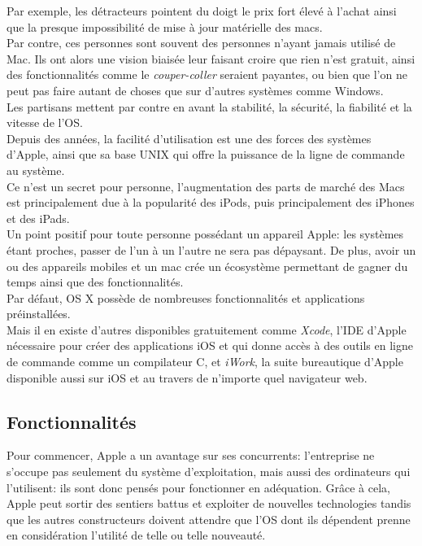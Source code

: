 Par exemple, les détracteurs pointent du doigt le prix fort élevé à l’achat
ainsi que la presque impossibilité de mise à jour matérielle des macs. \\
Par contre, ces personnes sont souvent des personnes n’ayant jamais utilisé de
Mac. Ils ont alors une vision biaisée leur faisant croire que rien n’est gratuit,
ainsi des fonctionnalités comme le \textit{couper-coller} seraient payantes, ou
bien que l’on ne peut pas faire autant de choses que sur d’autres systèmes comme
Windows. \\

Les partisans mettent par contre en avant la stabilité, la sécurité, la fiabilité
et la vitesse de l’OS. \\
Depuis des années, la facilité d’utilisation est une des forces des systèmes d’Apple,
ainsi que sa base UNIX qui offre la puissance de la ligne de commande au système. \\

Ce n’est un secret pour personne, l’augmentation des parts de marché des Macs
est principalement due à la popularité des iPods, puis principalement des iPhones
et des iPads. \\
Un point positif pour toute personne possédant un appareil Apple: les systèmes
étant proches, passer de l’un à un l’autre ne sera pas dépaysant. De plus, avoir
un ou des appareils mobiles et un mac crée un écosystème permettant de gagner du
temps ainsi que des fonctionnalités. \\

Par défaut, OS X possède de nombreuses fonctionnalités et applications
préinstallées. \\
Mais il en existe d’autres disponibles gratuitement comme \textit{Xcode},
l’IDE d’Apple nécessaire pour créer des applications iOS et qui donne accès à
des outils en ligne de commande comme un compilateur C, et \textit{iWork},
la suite bureautique d’Apple disponible aussi sur iOS et au travers de
n’importe quel navigateur web. \\

\clearpage

\subsection{Fonctionnalités}
Pour commencer, Apple a un avantage sur ses concurrents: l'entreprise ne
s'occupe pas seulement du système d'exploitation, mais aussi des ordinateurs
qui l'utilisent: ils sont donc pensés pour fonctionner en adéquation. Grâce à
cela, Apple peut sortir des sentiers battus et exploiter de nouvelles
technologies tandis que les autres constructeurs doivent attendre que l'OS dont
ils dépendent prenne en considération l'utilité de telle ou telle nouveauté. \\

